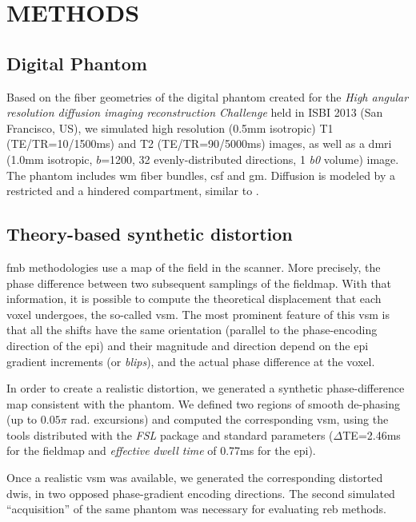 \section{METHODS}

\subsection{Digital Phantom}
Based on the fiber geometries of the digital phantom 
created for the \emph{High angular resolution diffusion imaging 
reconstruction Challenge} held in ISBI 2013 
(San Francisco, US), we simulated high resolution 
(0.5mm isotropic) T1 (TE/TR=10/1500ms) and T2 
(TE/TR=90/5000ms) images, as well as a \gls*{dmri}
(1.0mm isotropic, $b$=1200, 32 evenly-distributed 
directions, 1 \textit{b0} volume) image.
The phantom includes \gls*{wm} fiber bundles, 
\gls*{csf} and \gls*{gm}. Diffusion is modeled by a 
restricted and a hindered compartment, similar to
\cite{assaf_composite_2005}.

\subsection{Theory-based synthetic distortion}
\label{sec:distortion}
\Gls*{fmb} methodologies use a map
of the field in the scanner. More precisely, the
phase difference between two subsequent samplings
of the fieldmap. With that information, it is possible
to compute the theoretical displacement that each
voxel undergoes, the so-called \gls*{vsm}. The
most prominent feature of this \gls*{vsm} is that all
the shifts have the same orientation (parallel to the
phase-encoding direction of the \gls*{epi}) and their
magnitude and direction depend on the \gls*{epi} 
gradient increments (or \emph{blips}), and the actual
phase difference at the voxel.

In order to create a realistic distortion, we
generated a synthetic phase-difference map 
consistent with the phantom.  We defined two regions 
of smooth de-phasing (up to $0.05\pi$ rad. excursions) 
and computed the corresponding \gls*{vsm}, using the 
tools distributed with the \emph{FSL} package 
\cite{jenkinson_fsl_2012}  and
standard parameters ($\Delta$TE=2.46ms for the
fieldmap and \emph{effective dwell time} of 
0.77ms for the \gls*{epi}).

Once a realistic \gls*{vsm} was available, we generated
the corresponding distorted \glspl*{dwi}, in two opposed
phase-gradient encoding directions. The second simulated
``acquisition'' of the same phantom was necessary 
for evaluating \gls*{reb} methods.

